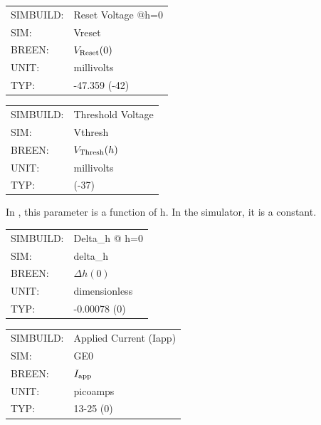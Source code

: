 \documentclass[12pt,openany,oneside]{book}
\begin{document}
\begin{flushleft}
\begin{tabular}{@{}ll@{}}
SIMBUILD: & Reset Voltage @h=0\\
SIM: & Vreset\\
BREEN: & $V_{\rm Reset}(0)$\\
UNIT: & millivolts\\
TYP: & -47.359 (-42)\\
\end{tabular}
\end{flushleft}
\filbreak
\vspace{\baselineskip}

\begin{flushleft}
\begin{tabular}{@{}ll@{}}
SIMBUILD: & Threshold Voltage\\
SIM: & Vthresh\\
BREEN: & $V_{\rm Thresh}(h)$\\
UNIT: & millivolts\\
TYP: & (-37)\\
\end{tabular}
\end{flushleft}
\noindent In \citet {breenhybrid2003}, this parameter is 
a function of h. In the simulator, it is a constant.
\filbreak
\vspace{2\baselineskip}

\begin{flushleft}
\begin{tabular}{@{}ll@{}}
SIMBUILD: & Delta\_h @ h=0\\
SIM: & delta\_h\\
BREEN: & $\Delta h(0)$\\
UNIT: & dimensionless\\
TYP: & -0.00078 (0)\\
\end{tabular}
\end{flushleft}
\noindent
\filbreak
\vspace{\baselineskip}

\begin{flushleft}
\begin{tabular}{@{}ll@{}}
SIMBUILD: & Applied Current (Iapp)\\
SIM: & GE0\\
BREEN: & $I_{\rm app}$\\
UNIT: & picoamps\\
TYP: & 13-25 (0)\\
\end{tabular}
\end{flushleft}
\noindent
\filbreak
\vspace{\baselineskip}
\end{document}
